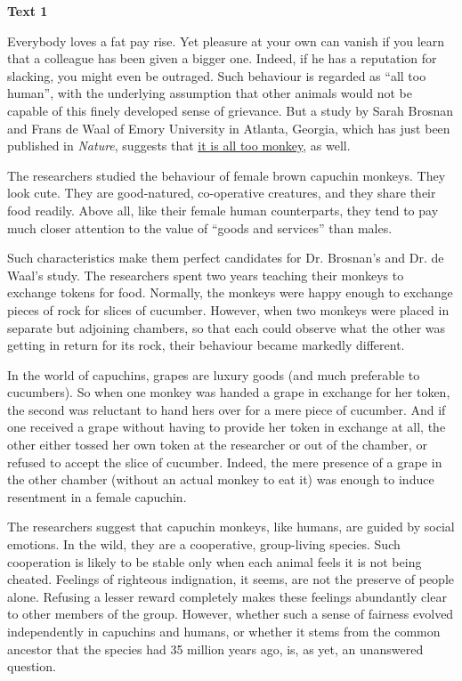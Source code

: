\begin{center}\textbf{Text 1}\end{center}

\qquad Everybody loves a fat pay rise. Yet pleasure at your own can vanish if you learn that a colleague has been given a bigger one. Indeed, if he has a reputation for slacking, you might even be outraged. Such behaviour is regarded as ``all too human'', with the underlying assumption that other animals would not be capable of this finely developed sense of grievance. But a study by Sarah Brosnan and Frans de Waal of Emory University in Atlanta, Georgia, which has just been published in \emph{Nature}, suggests that \ul{it is all too monkey}, as well.

\qquad The researchers studied the behaviour of female brown capuchin monkeys. They look cute. They are good-natured, co-operative creatures, and they share their food readily. Above all, like their female human counterparts, they tend to pay much closer attention to the value of ``goods and services'' than males.

\qquad Such characteristics make them perfect candidates for Dr. Brosnan's and Dr. de Waal's study. The researchers spent two years teaching their monkeys to exchange tokens for food. Normally, the monkeys were happy enough to exchange pieces of rock for slices of cucumber. However, when two monkeys were placed in separate but adjoining chambers, so that each could observe what the other was getting in return for its rock, their behaviour became markedly different.

\qquad In the world of capuchins, grapes are luxury goods (and much preferable to cucumbers). So when one monkey was handed a grape in exchange for her token, the second was reluctant to hand hers over for a mere piece of cucumber. And if one received a grape without having to provide her token in exchange at all, the other either tossed her own token at the researcher or out of the chamber, or refused to accept the slice of cucumber. Indeed, the mere presence of a grape in the other chamber (without an actual monkey to eat it) was enough to induce resentment in a female capuchin.

\qquad The researchers suggest that capuchin monkeys, like humans, are guided by social emotions. In the wild, they are a cooperative, group-living species. Such cooperation is likely to be stable only when each animal feels it is not being cheated. Feelings of righteous indignation, it seems, are not the preserve of people alone. Refusing a lesser reward completely makes these feelings abundantly clear to other members of the group. However, whether such a sense of fairness evolved independently in capuchins and humans, or whether it stems from the common ancestor that the species had 35 million years ago, is, as yet, an unanswered question.

